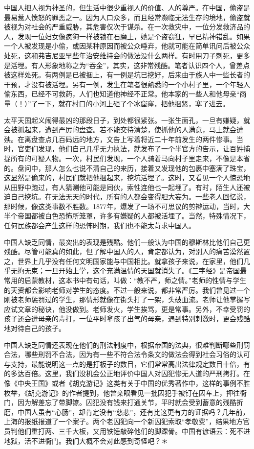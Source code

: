 \documentclass[12pt,oneside]{book}
\begin{document}
\begin{common-format}
中国人把人视为神圣的，但生活中很少重视人的价值、人的尊严。在中国，偷盗是最易惹人愤怒的罪恶之一。因为人口众多，而且经常濒临无法生存的境地，偷盗就被视为对社会的严重威胁，其危害仅次于谋杀。在一次救灾中，一位分发救济品的人，发现一位妇女像疯狗一样被锁在石磨上，她是个盗窃狂，早已精神错乱。如果一个人被发现是小偷，或因某种原因而被公众唾弃，他就可能在简单讯问后被公众处死，这和弗吉尼亚早些年治安维持会的做法没什么两样。有时用刀子刺死，更多是活埋。有人形象地称之为“吞金”，其实，这非常残酷。笔者认识四个人，曾差点被这样处死。有两例是已被捆上，有一例是坑已挖好，后来由于族人中一些长者的干预，才没有被活埋。另有一例，发生在笔者很熟悉的一个小村子里，一个年轻人偷东西，已经不可救药，人们也知道他神经不正常。他本家的一些人和他母亲“商量（！）”了一下，就在村口的小河上砸了个冰窟窿，把他捆紧，塞了进去。 

太平天国起义闹得最凶的那段日子，到处都很紧张。一张生面孔，一旦有嫌疑，就会被抓起来，遭到严厉的盘查。若不能交待清楚，使抓他的人满意，马上就会遭殃。在离盘查点几百码远的地方，文告上写着将近二十年前发生的两件惨事。当时，官吏们发现，他们自己几乎无力执法，就发布了一个半官方的告示，让百姓捕捉所有的可疑人物。一次，村民们发现，一个人骑着马向村子里走来，不像是本省的。盘问中，那人怎么也说不清自己的来历，接着又发现他的包裹中塞满了珠宝，这显然是偷来的，村民们就把他捆起来，挖坑活埋了。这时，又看见一个人惊恐地从田野中跑过，有人猜测他可能是同伙，索性连他也一起埋了。有时，陌生人还被迫自己挖坑。在无法无天的时代，所有的人都会变得胆大妄为。一些老人回忆说，那时候，像这类事数不胜数。1877年，爆发了一场不可思议的剪辫运动，当时，大半个帝国都被白色恐怖所笼罩，许多有嫌疑的人都被活埋了。当然，特殊情况下，任何民族都会产生这样的恐怖时期，我们也不能太苛求中国人。 

中国人缺乏同情，最突出的表现是残酷。他们一般认为中国的穆斯林比他们自己更残酷。尽管可能真的如此，但了解中国人的人，肯定都认为，对别人的痛苦漠然置之，世界上几乎没有任何文明国家能与中国相比。就拿孩子来说，在家里，他们几乎无拘无束；一旦开始上学，这个充满温情的天国就消失了。《三字经》是帝国最常用的启蒙教材，这本书中有句话，叫做：“教不严，师之情。”老师的性情与学生的天资都会影响老师对学生的态度。不过一般来说，都非常严厉。我们曾见过一个刚被老师惩罚过的学生，那情形就像在街头打了一架，头破血流。老师让他掌握写应试文章的秘诀，他没做到。老师发火，学生挨骂，更是常事。另外，不幸受罚的孩子还会遭母亲的毒打，一位平时拿孩子出气的母亲，遇到特别刺激时，更会残酷地对待自己的孩子。 

中国人缺乏同情还表现在他们的刑法制度中，根据帝国的法典，很难判断哪些刑罚合法，哪些刑罚不合法，因为有一些不符合法令条文的做法会得到社会习俗的认可与支持，最能说明这一点的是打板子的数目，它们常常高出法律规定数目十倍，有的多达百倍。这里，我们没机会公正地评价中国人对囚犯惨无人道的严刑拷打。在像《中央王国》或者《胡克游记》这类有关于中国的优秀著作中，这样的事例不胜枚举，《胡克游记》的作者提到，他曾亲眼看见一批囚犯手被钉在囚车上，押往衙门，因为解差忘了带脚镣。囚犯没有钱来打通关节，平时就会受到蓄意的残酷折磨，中国人虽有“心肠”，却肯定没有“慈悲”，还有比这更有力的证据吗？几年前，上海的报纸报道了一个案子。两个老囚犯向一个新囚犯索取“孝敬费”，结果地方官员判他们重打两、三千大板，又用铁锤敲碎他们的脚踝骨。中国有谚语云：死不进地狱，活不进衙门。我们大概不会对此感到奇怪吧？＊ 


\end{common-format}
\end{document}
